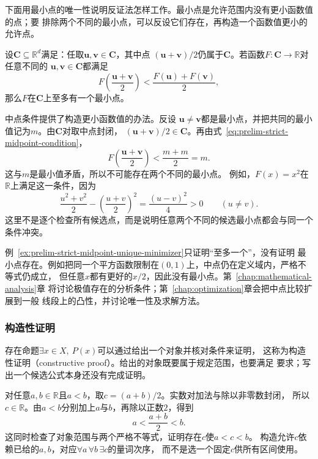 下面用最小点的唯一性说明反证法怎样工作。最小点是允许范围内没有更小函数值的点；要
排除两个不同的最小点，可以反设它们存在，再构造一个函数值更小的允许点。

\begin{example}[用反证法排除两个最小点]
\label{ex:prelim-strict-midpoint-unique-minimizer}
设$\bm{C}\subseteq\mathbb{R}^d$满足：任取$\bm{u},\bm{v}\in\bm{C}$，其中点
$(\bm{u}+\bm{v})/2$仍属于$\bm{C}$。若函数$F:\bm{C}\to\mathbb{R}$对任意不同的
$\bm{u},\bm{v}\in\bm{C}$都满足
\begin{equation}
  F\left(\frac{\bm{u}+\bm{v}}{2}\right)
  <
  \frac{F(\bm{u})+F(\bm{v})}{2},
  \label{eq:prelim-strict-midpoint-condition}
\end{equation}
那么$F$在$\bm{C}$上至多有一个最小点。

中点条件提供了构造更小函数值的办法。反设
$\bm{u}\neq\bm{v}$都是最小点，并把共同的最小值记为$m$。由$\bm{C}$对取中点封闭，
$(\bm{u}+\bm{v})/2\in\bm{C}$。再由式~\eqref{eq:prelim-strict-midpoint-condition}，
\[
  F\left(\frac{\bm{u}+\bm{v}}{2}\right)
  <
  \frac{m+m}{2}
  =m.
\]
这与$m$是最小值矛盾，所以不可能存在两个不同的最小点。
例如，$F(x)=x^2$在$\mathbb{R}$上满足这一条件，因为
\[
  \frac{u^2+v^2}{2}-\left(\frac{u+v}{2}\right)^2
  =\frac{(u-v)^2}{4}>0\qquad(u\neq v).
\]
这里不是逐个检查所有候选点，而是说明任意两个不同的候选最小点都会与同一个条件冲突。
\end{example}

例~\ref{ex:prelim-strict-midpoint-unique-minimizer}只证明“至多一个”，没有证明
最小点存在。例如把同一个平方函数限制在$(0,1)$上，中点仍在定义域内，严格不等式仍成立，
但任意$x$都有更好的$x/2$，因此没有最小点。第~\ref{chap:mathematical-analysis}章
将讨论极值存在的分析条件；第~\ref{chap:optimization}章会把中点比较扩展到一般
线段上的凸性，并讨论唯一性及求解方法。

\subsubsection{构造性证明}
\label{sec:prelim-constructive-proof}

存在命题$\exists x\in X,\ P(x)$可以通过给出一个对象并核对条件来证明，
这称为构造性证明（constructive proof）。给出的对象既要属于规定范围，也要满足
要求；写出一个候选公式本身还没有完成证明。

\begin{example}[构造两个实数之间的数]
\label{ex:prelim-constructive-midpoint}
对任意$a,b\in\mathbb{R}$且$a<b$，取$c=(a+b)/2$。实数对加法与除以非零数封闭，
所以$c\in\mathbb{R}$。由$a<b$分别加上$a$与$b$，再除以正数$2$，得到
\[
  a<\frac{a+b}{2}<b.
\]
这同时检查了对象范围与两个严格不等式，证明存在$c$使$a<c<b$。
构造允许$c$依赖已给的$a,b$，对应$\forall a\,\forall b\,\exists c$的量词次序，
而不是选一个固定$c$供所有区间使用。
\end{example}

